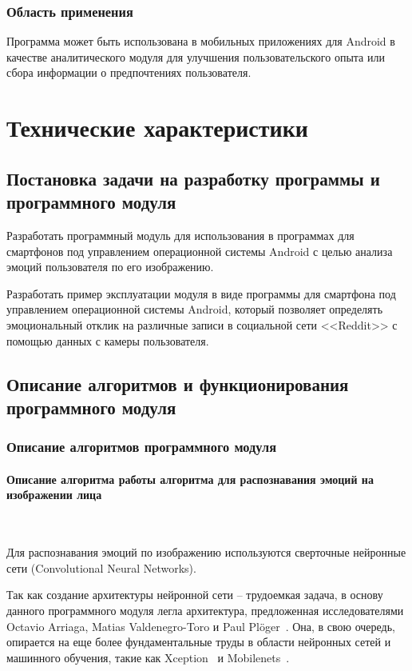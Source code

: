 \documentclass[a4paper,12pt]{article}
\begin{document}
    \subsubsection{Область применения}
    Программа может быть использована в мобильных приложениях для Android в качестве аналитического модуля для улучшения пользовательского опыта или сбора информации о предпочтениях пользователя.

    \newpage

    \section{Технические характеристики}

    \subsection{Постановка задачи на разработку программы и программного модуля}
    Разработать программный модуль для использования в программах для смартфонов под управлением операционной системы Android с целью анализа эмоций пользователя по его изображению.

    Разработать пример эксплуатации модуля в виде программы для смартфона под управлением операционной системы Android, который позволяет определять эмоциональный отклик на различные записи в социальной сети <<Reddit>> с помощью данных с камеры пользователя.

    \subsection{Описание алгоритмов и функционирования программного модуля}

    \subsubsection{Описание алгоритмов программного модуля}

    \paragraph{Описание алгоритма работы алгоритма для распознавания эмоций на изображении лица}
    \ \vspace{.5em}

    Для распознавания эмоций по изображению используются сверточные нейронные сети (Convolutional Neural Networks).

    Так как создание архитектуры нейронной сети -- трудоемкая задача, в основу данного программного модуля легла архитектура, предложенная исследователями Octavio Arriaga, Matias Valdenegro-Toro и Paul Plöger~\cite{arch}.
    Она, в свою очередь, опирается на еще более фундаментальные труды в области нейронных сетей и машинного обучения, такие как Xception~\cite{xception} и Mobilenets~\cite{mobilenets}.
\end{document}
